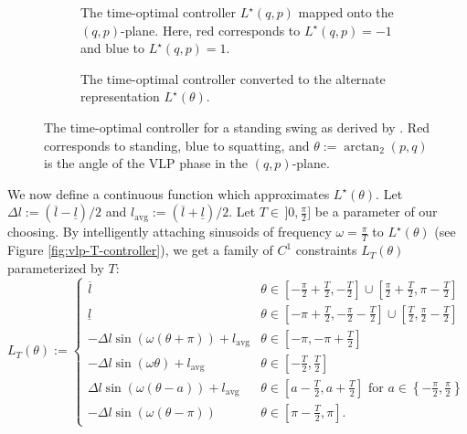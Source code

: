 \begin{figure}
   \centering
   \begin{subfigure}[t]{0.45\textwidth}
      
      \caption{The time-optimal controller \(L^\star(q,p)\) mapped onto the
      \((q,p)\)-plane. Here, red corresponds to \(L^\star(q,p) = -1\) and blue
      to \(L^\star(q,p) = 1\).}
      \label{fig:vlp-optimal-controller-qp-plane}
   \end{subfigure}
   \hfill
   \begin{subfigure}[t]{0.45\textwidth}
      
      \caption{The time-optimal controller converted to the alternate
      representation \(L^\star(\theta)\).}
      \label{fig:vlp-optimal-controller}
   \end{subfigure}
   \caption{The time-optimal controller for a standing swing as derived by
      \cite{pumping_swing_standing_squatting}. 
      Red corresponds to standing, blue to squatting, and 
      \(\theta := \arctan_2(p,q)\) is the angle of the VLP phase in the
      \((q,p)\)-plane.}
\end{figure}

We now define a continuous function which
approximates \(L^\star(\theta)\). 
Let \(\Delta l := (\overline{l} - \underline{l})/2\) and 
\(l_{\text{avg}} := (\overline{l} + \underline{l})/2\).
Let \(T \in \, ]0,\frac{\pi}{2}]\) be a parameter of our choosing.
By intelligently attaching sinusoids of frequency \(\omega = \frac{\pi}{T}\) to
\(L^\star(\theta)\) (see Figure \ref{fig:vlp-T-controller}), we get a family of
\(C^1\) constraints \(L_T(\theta)\) parameterized
by \(T\): 
\begin{equation}\label{eqn:vlp-T-controller}
   L_T(\theta) := \begin{cases}
      \overline{l} & \theta \in \left[-\frac{\pi}{2} + \frac{T}{2}, -\frac{T}{2}\right] 
      \cup \left[\frac{\pi}{2} + \frac{T}{2}, \pi - \frac{T}{2}\right] \\
      \underline{l} & \theta \in \left[-\pi + \frac{T}{2}, -\frac{\pi}{2} - \frac{T}{2}\right] 
      \cup \left[\frac{T}{2}, \frac{\pi}{2} - \frac{T}{2}\right] \\
      -\Delta l \sin(\omega(\theta + \pi)) + l_{\text{avg}} & \theta \in
      \left[-\pi,-\pi + \frac{T}{2}\right] \\
      -\Delta l \sin(\omega \theta) + l_\text{avg} & \theta \in [-\frac{T}{2},
      \frac{T}{2}] \\
      \Delta l \sin(\omega(\theta - a)) + l_\text{avg} & 
      \theta \in \left[a - \frac{T}{2}, a + \frac{T}{2}\right] \text{ for } 
      a \in \left\{-\frac{\pi}{2}, \frac{\pi}{2}\right\} \\
      -\Delta l \sin(\omega(\theta-\pi)) & \theta \in \left[\pi - \frac{T}{2},\pi\right] 
      .
   \end{cases}
\end{equation}

